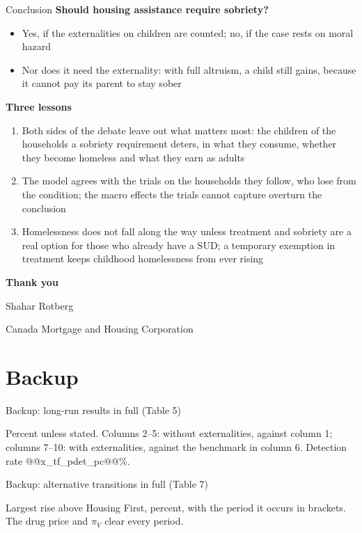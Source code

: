 \documentclass[aspectratio=169,11pt]{beamer}
\newcommand{\HF}{Housing First}
\newcommand{\source}[1]{\par\vfill{\color{lgrey}\tiny #1}}
\begin{document}
\begin{frame}{Conclusion}
\textbf{Should housing assistance require sobriety?}
\begin{itemize}
\item \alert{Yes}, if the externalities on children are counted; \alert{no}, if the case rests on moral hazard
\item Nor does it need the externality: with full altruism, a child still gains, because it cannot pay its parent to stay sober
\end{itemize}
\vspace{0.1cm}
\textbf{Three lessons}
\small
\begin{enumerate}\setlength\itemsep{0.25em}
\item Both sides of the debate leave out what matters most: the children of the households a sobriety requirement deters, in what they consume, whether they become homeless and what they earn as adults
\item The model agrees with the trials on the households they follow, who lose from the condition; the macro effects the trials cannot capture overturn the conclusion
\item Homelessness does not fall along the way unless treatment and sobriety are a real option for those who already have a SUD; a temporary exemption in treatment keeps childhood homelessness from ever rising
\end{enumerate}
\end{frame}

{
\begin{frame}
\centering\vfill
{\Large\bfseries\color{dblue}Thank you}\par\vspace{0.4cm}
Shahar Rotberg\par
{\small Canada Mortgage and Housing Corporation}\par
\vfill
\end{frame}}

\appendix
\section*{Backup}

\begin{frame}{Backup: long-run results in full (Table 5)}
\centering
\resizebox{0.86\textwidth}{!}{}
\source{Percent unless stated. Columns 2--5: without externalities, against column 1; columns 7--10: with externalities, against the benchmark in column 6. Detection rate @@x_tf_pdet_pc@@\%.}
\end{frame}

\begin{frame}{Backup: alternative transitions in full (Table 7)}
\centering\small
\resizebox{\textwidth}{!}{}
\source{Largest rise above \HF, percent, with the period it occurs in brackets. The drug price and $\pi_V$ clear every period.}
\end{frame}
\end{document}
